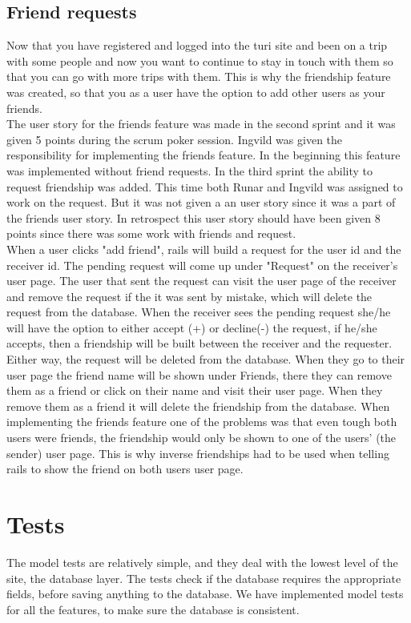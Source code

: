\documentclass[a4paper]{article}
\begin{document}
\subsection{Friend requests}
Now that you have registered and logged into the turi site and been on a trip with some people and now you want to continue to stay in touch with them so that you can go with more trips with them. This is why the friendship feature was created, so that you as a user have the option to add other users as your friends. \\

\noindent
The user story for the friends feature was made in the second sprint and it was given 5 points during the scrum poker session. Ingvild was given the responsibility for implementing the friends feature. In the beginning this feature was implemented without friend requests. In the third sprint the ability to request friendship was added. This time both Runar and Ingvild was assigned to work on the request. But it was not given a an user story since it was a part of the friends user story. In retrospect this user story should have been given 8 points since there was some work with friends and request. \\

\noindent
When a user clicks "add friend", rails will build a request for the user id and the receiver id. The pending request will come up under "Request" on the receiver's user page. The user that sent the request can visit the user page of the receiver and remove the request if the it was sent by mistake, which will delete the request from the database. When the receiver sees the pending request she/he will have the option to either accept (+) or decline(-) the request, if he/she accepts, then a friendship will be built between the receiver and the requester. Either way, the request will be deleted from the database. When they go to their user page the friend name will be shown under Friends, there they can remove them as a friend or click on their name and visit their user page. When they remove them as a friend it will delete the friendship from the database. When implementing the friends feature one of the problems was that even tough both users were friends, the friendship would only be shown to one of the users' (the sender) user page. This is why inverse friendships had to be used when telling rails to show the friend on both users user page. \\

\section{Tests}
\noindent
The model tests are relatively simple, and they deal with the lowest level of the site, the database layer. The tests check if the database requires the appropriate fields, before saving anything to the database. We have implemented model tests for all the features, to make sure the database is consistent.
\\
\end{document}
